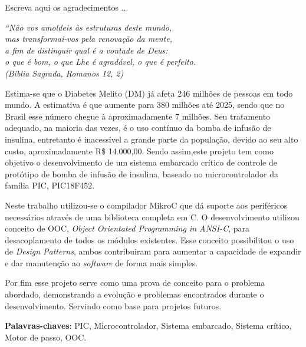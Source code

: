 \documentclass[	12pt, Times, openright, twoside, a4paper, english, brazil]{abntex2}
\begin{document}
\begin{agradecimentos}
Escreva aqui os agradecimentos ...

\end{agradecimentos}

\begin{epigrafe}
    \vspace*{\fill}
	\begin{flushright}
		\textit{``Não vos amoldeis às estruturas deste mundo, \\
		mas transformai-vos pela renovação da mente, \\
		a fim de distinguir qual é a vontade de Deus: \\
		o que é bom, o que Lhe é agradável, o que é perfeito.\\
		(Bíblia Sagrada, Romanos 12, 2)}
	\end{flushright}
\end{epigrafe}


\begin{resumo}
Estima-se que o Diabetes Melito (DM) já afeta 246 milhões de pessoas em todo mundo. A estimativa é que aumente para 380 milhões até 2025, sendo que no Brasil esse número chegue à aproximadamente 7 milhões. Seu tratamento adequado, na maioria das vezes, é o uso contínuo da bomba de infusão de insulina, entretanto é inacessível a grande parte da população, devido ao seu alto custo, aproximadamente R\$ 14.000,00. Sendo assim,este projeto tem como objetivo o desenvolvimento de um sistema embarcado crítico de controle de protótipo de bomba de infusão de insulina, baseado no microcontrolador da família PIC, PIC18F452. 

Neste trabalho utilizou-se o compilador MikroC que dá suporte aos periféricos necessários através de uma biblioteca completa em C. O desenvolvimento utilizou conceito de OOC, \emph{Object Orientated Programming in ANSI-C}, para desacoplamento de todos os módulos existentes. Esse conceito possibilitou o uso de \emph{Design Patterns}, ambos contribuiram para aumentar a capacidade de expandir e dar manutenção ao \emph{software} de forma mais simples.

Por fim esse projeto serve como uma prova de conceito para o problema abordado, demonstrando a evolução e problemas encontrados durante o desenvolvimento. Servindo como base para projetos futuros.

 
 \vspace{\onelineskip}
    
 \noindent
 \textbf{Palavras-chaves}: PIC, Microcontrolador, Sistema embarcado, Sistema crítico, Motor de passo, OOC.
\end{resumo}
\end{document}
